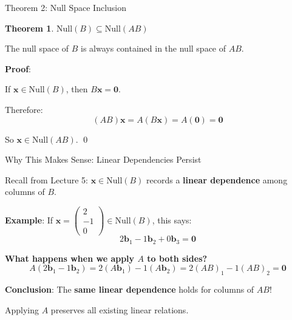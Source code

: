 \documentclass[10pt]{beamer}
\theoremstyle{definition}
\newtheorem{thm}{Theorem}[section]
\newcommand{\x}[1]{\alert{\textbf{#1}}}
\begin{document}
\begin{frame}{Theorem 2: Null Space Inclusion}

\begin{thm}
$\text{Null}(B) \subseteq \text{Null}(AB)$

The null space of $B$ is always contained in the null space of $AB$.
\end{thm}

\vspace{1em}

\x{Proof}:

If $\mathbf{x} \in \text{Null}(B)$, then $B\mathbf{x} = \mathbf{0}$.

Therefore:
$$(AB)\mathbf{x} = A(B\mathbf{x}) = A(\mathbf{0}) = \mathbf{0}$$

So $\mathbf{x} \in \text{Null}(AB)$. \qed

\end{frame}

\begin{frame}{Why This Makes Sense: Linear Dependencies Persist}

Recall from Lecture 5: $\mathbf{x} \in \text{Null}(B)$ records a \x{linear dependence} among columns of $B$.

\vspace{1em}

\x{Example}: If $\mathbf{x} = \begin{pmatrix} 2 \\ -1 \\ 0 \end{pmatrix} \in \text{Null}(B)$, this says:
$$2\mathbf{b}_1 - 1\mathbf{b}_2 + 0\mathbf{b}_3 = \mathbf{0}$$

\vspace{1em}

\x{What happens when we apply $A$ to both sides?}
$$A(2\mathbf{b}_1 - 1\mathbf{b}_2) = 2(A\mathbf{b}_1) - 1(A\mathbf{b}_2) = 2(AB)_1 - 1(AB)_2 = \mathbf{0}$$

\vspace{1em}

\x{Conclusion}: The \x{same linear dependence} holds for columns of $AB$!

\vspace{0.5em}

Applying $A$ preserves all existing linear relations.

\end{frame}
\end{document}
